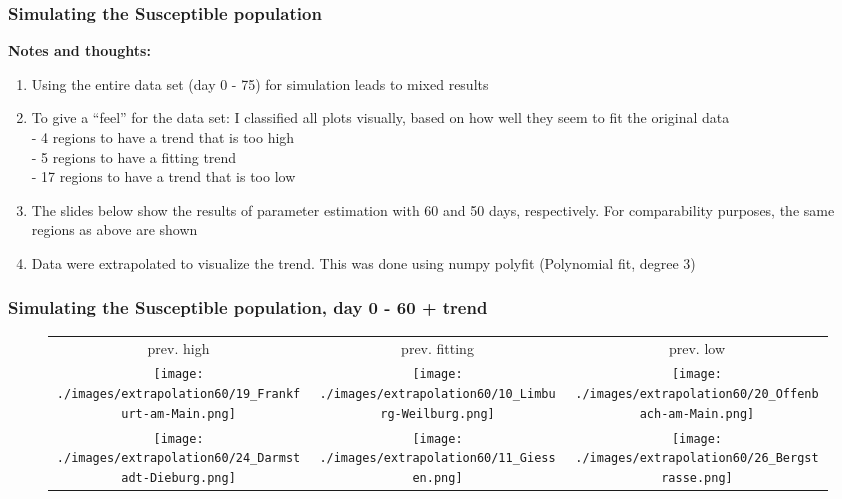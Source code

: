 \documentclass{beamer}
\begin{document}
\begin{frame}
	\frametitle{Simulating the Susceptible population}
	\textbf{Notes and thoughts:}
	\begin{enumerate}[$\bullet$]
		\item Using the entire data set (day 0 - 75) for simulation leads to mixed results
		\item To give a ``feel'' for the data set: I classified all plots visually, based on how well they seem to fit the original data\\
			- 4 regions to have  a trend that is too high\\
			- 5 regions to have a fitting trend\\
			- 17 regions to have a trend that is too low
		\item The slides below show the results of parameter estimation with 60 and 50 days, respectively. For comparability purposes, the same regions as above are shown
		\item Data were extrapolated to visualize the trend. This was done using numpy polyfit (Polynomial fit, degree 3)
	\end{enumerate}
\end{frame}

\begin{frame}
	\frametitle{Simulating the Susceptible population, day 0 - 60 + trend}
	\begin{center}
		\begin{figure}
			\begin{adjustwidth}{-0.8cm}{}
			\begin{tabular}{ccc}
				prev. high & prev. fitting & prev. low \\
				\texttt{[image: ./images/extrapolation60/19\_Frankfurt-am-Main.png]}
					& \texttt{[image: ./images/extrapolation60/10\_Limburg-Weilburg.png]}
					& \texttt{[image: ./images/extrapolation60/20\_Offenbach-am-Main.png]} \\
				\texttt{[image: ./images/extrapolation60/24\_Darmstadt-Dieburg.png]}
					& \texttt{[image: ./images/extrapolation60/11\_Giessen.png]}
					& \texttt{[image: ./images/extrapolation60/26\_Bergstrasse.png]}
			\end{tabular}
			\end{adjustwidth}
		\end{figure}
	\end{center}
\end{frame}
\end{document}
